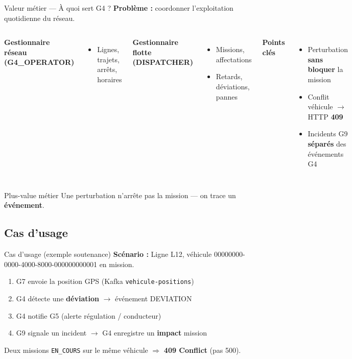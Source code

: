\documentclass[aspectratio=169,xcolor=table]{beamer}
\begin{document}
\begin{frame}{Valeur métier — À quoi sert G4 ?}
  \textbf{Problème :} coordonner l'exploitation quotidienne du réseau.
  \vspace{0.3cm}
  \begin{columns}
    \textbf{Gestionnaire réseau (G4\_OPERATOR)}
    \begin{itemize}
      \item Lignes, trajets, arrêts, horaires
    \end{itemize}
    \vspace{0.2cm}
    \textbf{Gestionnaire flotte (DISPATCHER)}
    \begin{itemize}
      \item Missions, affectations
      \item Retards, déviations, pannes
    \end{itemize}
    \textbf{Points clés}
    \begin{itemize}
      \item Perturbation \textbf{sans bloquer} la mission
      \item Conflit véhicule $\rightarrow$ HTTP \textbf{409}
      \item Incidents G9 \textbf{séparés} des événements G4
    \end{itemize}
  \end{columns}
  \vspace{0.3cm}
  \begin{block}{Plus-value métier}
    Une perturbation n'arrête pas la mission — on trace un \textbf{événement}.
  \end{block}
\end{frame}

\subsection{Cas d'usage}

\begin{frame}{Cas d'usage (exemple soutenance)}
  \textbf{Scénario :} Ligne L12, véhicule 00000000-0000-4000-8000-000000000001 en mission.
  \begin{enumerate}
    \item G7 envoie la position GPS (Kafka \texttt{vehicule-positions})
    \item G4 détecte une \textbf{déviation} $\rightarrow$ événement DEVIATION
    \item G4 notifie G5 (alerte régulation / conducteur)
    \item G9 signale un incident $\rightarrow$ G4 enregistre un \textbf{impact} mission
  \end{enumerate}
  \vspace{0.2cm}
  \small Deux missions \texttt{EN\_COURS} sur le même véhicule $\Rightarrow$ \textbf{409 Conflict} (pas 500).
\end{frame}
\end{document}
